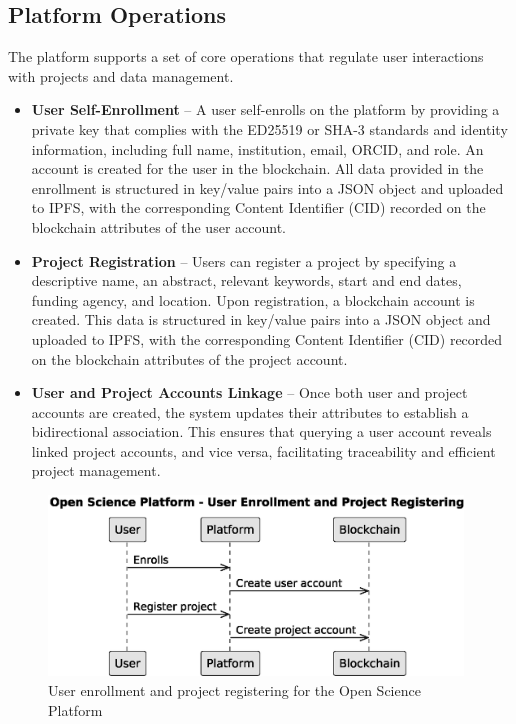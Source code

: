 \documentclass{article}
\begin{document}
\subsection{Platform Operations}
The platform supports a set of core operations that regulate user interactions with projects and data management.

\begin{itemize}
      \item \textbf{User Self-Enrollment} – A user self-enrolls on the platform by providing a private key that complies with the ED25519 or SHA-3 standards and identity information, including full name, institution, email, ORCID, and role. An account is created for the user in the blockchain. All data provided in the enrollment is structured in key/value pairs into a JSON object and uploaded to IPFS, with the corresponding Content Identifier (CID) recorded on the blockchain attributes of the user account.

      \item \textbf{Project Registration} – Users can register a project by specifying a descriptive name, an abstract, relevant keywords, start and end dates, funding agency, and location. Upon registration, a blockchain account is created. This data is structured in key/value pairs into a JSON object and uploaded to IPFS, with the corresponding Content Identifier (CID) recorded on the blockchain attributes of the project account.


      \item \textbf{User and Project Accounts Linkage} – Once both user and project accounts are created, the system updates their attributes to establish a bidirectional association. This ensures that querying a user account reveals linked project accounts, and vice versa, facilitating traceability and efficient project management.
\end{itemize}


\begin{figure}[htbp]
      \centering
      \includegraphics[width=0.98\textwidth, keepaspectratio]{c4_platform_operations_1}
      \caption{User enrollment and project registering for the Open Science Platform}
      \label{fig:c4_operations_diagram}
\end{figure}
\end{document}

